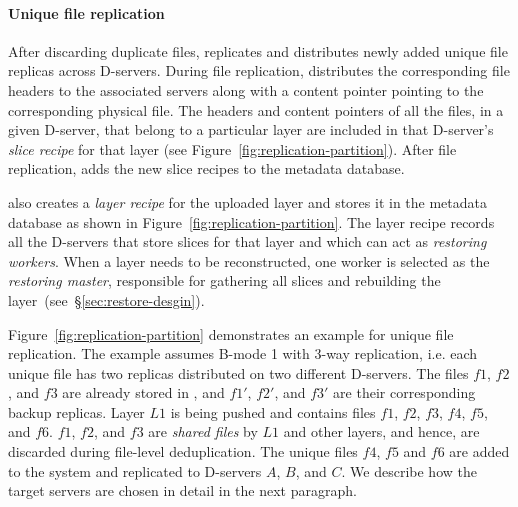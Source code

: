 \paragraph{Unique file replication}


After discarding duplicate files,
\sysname replicates and distributes newly added unique file replicas across D-servers.
%
During file replication, \sysname distributes the corresponding
file headers to the associated servers 
along with a content pointer pointing to the corresponding physical file. 
The headers and content pointers of all the files, in a given D-server, that belong to a particular layer are included in that D-server's \emph{slice recipe} for that layer (see Figure~\ref{fig:replication-partition}). 
After file replication, \sysname adds the new slice recipes to the metadata database.

\sysname also creates a \emph{layer recipe} for the uploaded layer and stores it in the metadata database
as shown in Figure~\ref{fig:replication-partition}.
The layer recipe records all the D-servers that store slices for that layer and which can act
as \emph{restoring workers}. When a layer needs to be reconstructed,
one worker is selected as the \emph{restoring master}, responsible 
for gathering all slices and rebuilding the layer~(see~\S\ref{sec:restore-desgin}).

Figure~\ref{fig:replication-partition} demonstrates an example for unique file replication.
The example assumes B-mode 1 with 3-way replication, i.e. each unique file has two replicas distributed
on two different D-servers.
The files $f1$, $f2$, and $f3$ are already stored in \sysname,
and $f1'$, $f2'$, and $f3'$ are their corresponding backup replicas.
Layer $L1$ is being pushed and contains files $f1$, $f2$, $f3$, $f4$, $f5$, and $f6$. 
$f1$, $f2$, and $f3$ are \emph{shared files} by $L1$ and other layers, and hence,
are discarded during file-level deduplication.
The unique files $f4$, $f5$ and $f6$ are added to the system and
replicated to D-servers $A$, $B$, and $C$. We describe how the target servers are chosen in detail
in the next paragraph.

